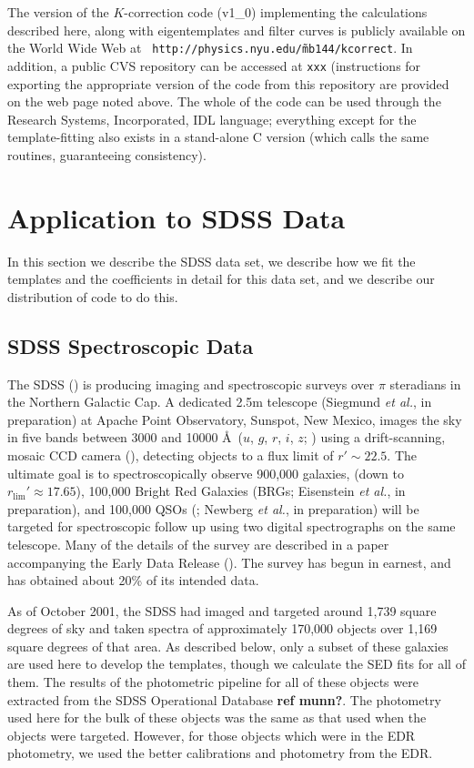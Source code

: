 \documentclass[10pt,preprint]{aastex}
\begin{document}
The version of the $K$-correction code (v1\_0) implementing the
calculations described here, along with eigentemplates and filter
curves is publicly available on the World Wide Web at {\tt
http://physics.nyu.edu/\~mb144/kcorrect}. In addition, a public CVS
repository can be accessed at {\tt xxx} (instructions for exporting
the appropriate version of the code from this repository are provided
on the web page noted above. The whole of the code can be used through
the Research Systems, Incorporated, IDL language; everything except
for the template-fitting also exists in a stand-alone C version (which
calls the same routines, guaranteeing consistency).

\section{Application to SDSS Data}
\label{data}

In this section we describe the SDSS data set, we describe how we fit
the templates and the coefficients in detail for this data set, and we
describe our distribution of code to do this.

\subsection{SDSS Spectroscopic Data}

The SDSS (\citealt{york00a}) is producing imaging and spectroscopic
surveys over $\pi$ steradians in the Northern Galactic Cap. A
dedicated 2.5m telescope (Siegmund {\it et al.}, in preparation) at
Apache Point Observatory, Sunspot, New Mexico, images the sky in five
bands between 3000 and 10000 \AA\ ($u$, $g$, $r$, $i$, $z$;
\citealt{fukugita96a}) using a drift-scanning, mosaic CCD camera
(\citealt{gunn98a}), detecting objects to a flux limit of $r'\sim
22.5$. The ultimate goal is to spectroscopically observe 900,000
galaxies, (down to $r_{\mathrm{lim}}'\approx 17.65$), 100,000 Bright
Red Galaxies (BRGs; Eisenstein {\it et al.}, in preparation), and
100,000 QSOs (\citealt{fan99a}; Newberg {\it et al.}, in preparation)
will be targeted for spectroscopic follow up using two digital
spectrographs on the same telescope. Many of the details of the survey
are described in a paper accompanying the Early Data Release
(\citealt{stoughton01a}). The survey has begun in earnest, and has
obtained about 20\% of its intended data.

As of October 2001, the SDSS had imaged and targeted around 1,739
square degrees of sky and taken spectra of approximately 170,000
objects over 1,169 square degrees of that area. As described below,
only a subset of these galaxies are used here to develop the
templates, though we calculate the SED fits for all of them. The
results of the photometric pipeline for all of these objects were
extracted from the SDSS Operational Database {\bf ref munn?}. The
photometry used here for the bulk of these objects was the same as
that used when the objects were targeted.  However, for those objects
which were in the EDR photometry, we used the better calibrations and
photometry from the EDR.
\end{document}
